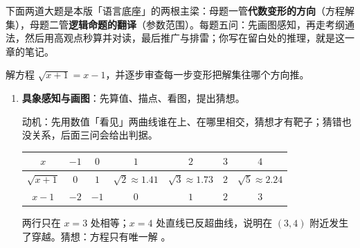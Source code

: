 
下面两道大题是本版「语言底座」的两根主梁：母题一管\textbf{代数变形的方向}（方程解集），母题二管\textbf{逻辑命题的翻译}（参数范围）。每题五问：先画图感知，再走考纲通法，然后用高观点秒算并对读，最后推广与排雷；你写在留白处的推理，就是这一章的笔记。


\begin{tcolorbox}[
  breakable, enhanced, sharp corners,
  colback=structurecolor!3, colframe=structurecolor!70!black, boxrule=0.6pt,
  title={\bfseries 解答即笔记·五问连环母题一：平方的代价与换元的同解},
  coltitle=black, fonttitle=\small,
  attach boxed title to top left={xshift=2mm, yshift=-2mm},
  boxed title style={sharp corners, colback=white,
    colframe=structurecolor!70!black, boxrule=0.4pt},
  top=7pt]

解方程 $\sqrt{x+1}=x-1$，并逐步审查每一步变形把解集往哪个方向推。

\begin{enumerate}[label=(\arabic*), itemsep=4pt]
\item \textbf{具象感知与画图}：先算值、描点、看图，提出猜想。

动机：先用数值「看见」两曲线谁在上、在哪里相交，猜想才有靶子；猜错也没关系，后面三问会给出判据。

\begin{center}\footnotesize\renewcommand{\arraystretch}{1.35}
\begin{tabular}{c|cccccc}
$x$ & $-1$ & $0$ & $1$ & $2$ & $3$ & $4$ \\ \hline
$\sqrt{x+1}$ & $0$ & $1$ & $\sqrt2\approx1.41$ & $\sqrt3\approx1.73$ & $2$ & $\sqrt5\approx2.24$ \\ \hline
$x-1$ & $-2$ & $-1$ & $0$ & $1$ & $2$ & $3$
\end{tabular}
\end{center}

两行只在 $x=3$ 处相等；$x=4$ 处直线已反超曲线，说明在 $(3,4)$ 附近发生了穿越。猜想：方程只有唯一解 。


\end{enumerate}
\end{tcolorbox}
